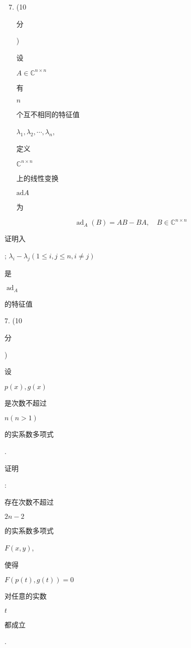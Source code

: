 \documentclass[10pt]{article}
\begin{document}
\begin{enumerate}
  \setcounter{enumi}{6}
  \item (10 \begin{CJK}{UTF8}{mj}分\end{CJK}) \begin{CJK}{UTF8}{mj}设\end{CJK} $A \in \mathbb{C}^{n \times n}$ \begin{CJK}{UTF8}{mj}有\end{CJK} $n$ \begin{CJK}{UTF8}{mj}个互不相同的特征值\end{CJK} $\lambda_{1}, \lambda_{2}, \cdots, \lambda_{n}$, \begin{CJK}{UTF8}{mj}定义\end{CJK} $\mathbb{C}^{n \times n}$ \begin{CJK}{UTF8}{mj}上的线性变换\end{CJK} $\mathrm{ad} A$ \begin{CJK}{UTF8}{mj}为\end{CJK}
\end{enumerate}
$$
\operatorname{ad}_{A}(B)=A B-B A, \quad B \in \mathbb{C}^{n \times n}
$$
\begin{CJK}{UTF8}{mj}证明入\end{CJK}; $\lambda_{i}-\lambda_{j}(1 \leq i, j \leq n, i \neq j)$ \begin{CJK}{UTF8}{mj}是\end{CJK} $\operatorname{ad}_{A}$ \begin{CJK}{UTF8}{mj}的特征值\end{CJK} 7. (10 \begin{CJK}{UTF8}{mj}分\end{CJK}) \begin{CJK}{UTF8}{mj}设\end{CJK} $p(x), g(x)$ \begin{CJK}{UTF8}{mj}是次数不超过\end{CJK} $n(n>1)$ \begin{CJK}{UTF8}{mj}的实系数多项式\end{CJK}. \begin{CJK}{UTF8}{mj}证明\end{CJK}: \begin{CJK}{UTF8}{mj}存在次数不超过\end{CJK} $2 n-2$ \begin{CJK}{UTF8}{mj}的实系数多项式\end{CJK} $F(x, y)$, \begin{CJK}{UTF8}{mj}使得\end{CJK} $F(p(t), g(t))=0$ \begin{CJK}{UTF8}{mj}对任意的实数\end{CJK} $t$ \begin{CJK}{UTF8}{mj}都成立\end{CJK}.
\end{document}
